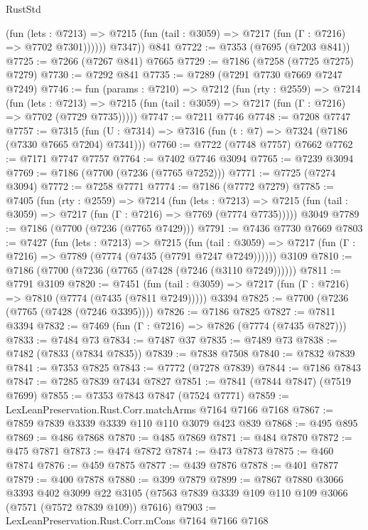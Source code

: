 \begin{lexlean}{RustStd}
\begin{coremodule}
              (fun (lets : @7213) =>
              @7215 (fun (tail : @3059) => @7217 (fun (Γ : @7216) => @7702 @7301))))))
        @7347))
    @841
@7722 := @7353 (@7695 (@7203 @841))
@7725 := @7266 (@7267 @841) @7665
@7729 := @7186 (@7258 (@7725 @7275) @7279)
@7730 := @7292 @841
@7735 := @7289 (@7291 @7730 @7669 @7247 @7249)
@7746 := fun (params : @7210) =>
  @7212
    (fun (rty : @2559) =>
    @7214
      (fun (lets : @7213) =>
      @7215 (fun (tail : @3059) => @7217 (fun (Γ : @7216) => @7702 (@7729 @7735)))))
@7747 := @7211 @7746
@7748 := @7208 @7747
@7757 := @7315 (fun (U : @7314) => @7316 (fun (t : @7) => @7324 (@7186 (@7330 @7665 @7204) @7341)))
@7760 := @7722 (@7748 @7757) @7662
@7762 := @7171 @7747 @7757
@7764 := @7402 @7746 @3094
@7765 := @7239 @3094
@7769 := @7186 (@7700 (@7236 (@7765 @7252)))
@7771 := @7725 (@7274 @3094)
@7772 := @7258 @7771
@7774 := @7186 (@7772 @7279)
@7785 := @7405
    (fun (rty : @2559) =>
    @7214
      (fun (lets : @7213) =>
      @7215 (fun (tail : @3059) => @7217 (fun (Γ : @7216) => @7769 (@7774 @7735)))))
    @3049
@7789 := @7186 (@7700 (@7236 (@7765 @7429)))
@7791 := @7436 @7730 @7669
@7803 := @7427
    (fun (lets : @7213) =>
    @7215
      (fun (tail : @3059) => @7217 (fun (Γ : @7216) => @7789 (@7774 (@7435 (@7791 @7247 @7249))))))
    @3109
@7810 := @7186 (@7700 (@7236 (@7765 (@7428 (@7246 (@3110 @7249))))))
@7811 := @7791 @3109
@7820 := @7451
    (fun (tail : @3059) => @7217 (fun (Γ : @7216) => @7810 (@7774 (@7435 (@7811 @7249)))))
    @3394
@7825 := @7700 (@7236 (@7765 (@7428 (@7246 @3395))))
@7826 := @7186 @7825
@7827 := @7811 @3394
@7832 := @7469 (fun (Γ : @7216) => @7826 (@7774 (@7435 @7827)))
@7833 := @7484 @73
@7834 := @7487 @37
@7835 := @7489 @73
@7838 := @7482 (@7833 (@7834 @7835))
@7839 := @7838 @7508
@7840 := @7832 @7839
@7841 := @7353 @7825
@7843 := @7772 (@7278 @7839)
@7844 := @7186 @7843
@7847 := @7285 @7839 @7434 @7827
@7851 := @7841 (@7844 @7847) (@7519 @7699)
@7855 := @7353 @7843 @7847 (@7524 @7771)
@7859 := LexLeanPreservation.Rust.Corr.matchArms @7164 @7166 @7168
@7867 := @7859 @7839 @3339 @3339 @110 @110 @3079 @423 @839
@7868 := @495 @895
@7869 := @486 @7868
@7870 := @485 @7869
@7871 := @484 @7870
@7872 := @475 @7871
@7873 := @474 @7872
@7874 := @473 @7873
@7875 := @460 @7874
@7876 := @459 @7875
@7877 := @439 @7876
@7878 := @401 @7877
@7879 := @400 @7878
@7880 := @399 @7879
@7899 := @7867
    @7880
    @3066
    @3393
    @402
    @3099
    @22
    @3105
    (@7563 @7839 @3339 @109 @110 @109 @3066 (@7571 (@7572 @7839 @109)) @7616)
@7903 := LexLeanPreservation.Rust.Corr.mCons @7164 @7166 @7168

\end{coremodule}
\end{lexlean}
